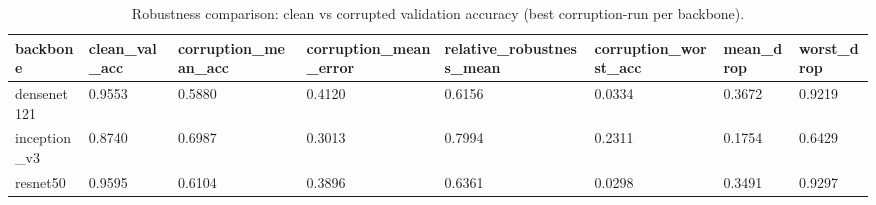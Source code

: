 \begin{table}[t]
\centering
\caption{Robustness comparison: clean vs corrupted validation accuracy (best corruption-run per backbone).}
\label{tab:robustness\_comparison}
\begin{tabular}{llllllll}
\toprule
backbone & clean\_val\_acc & corruption\_mean\_acc & corruption\_mean\_error & relative\_robustness\_mean & corruption\_worst\_acc & mean\_drop & worst\_drop \\
\midrule
densenet121 & 0.9553 & 0.5880 & 0.4120 & 0.6156 & 0.0334 & 0.3672 & 0.9219 \\
inception\_v3 & 0.8740 & 0.6987 & 0.3013 & 0.7994 & 0.2311 & 0.1754 & 0.6429 \\
resnet50 & 0.9595 & 0.6104 & 0.3896 & 0.6361 & 0.0298 & 0.3491 & 0.9297 \\
\bottomrule
\end{tabular}
\end{table}
